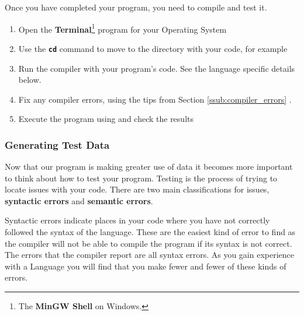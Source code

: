 Once you have completed your program, you need to compile and test it. 

\begin{enumerate}
  \item Open the \textbf{Terminal}\footnote{The \textbf{MinGW Shell} on Windows.} program for your Operating System
  \item Use the \texttt{\textbf{cd}} command to move to the directory with your code, for example \newline {}
  \item Run the compiler with your program's code. See the language specific details below.
  \item Fix any compiler errors, using the tips from Section \ref{ssub:compiler_errors} .
  \item Execute the program using  and check the results
\end{enumerate}



\subsubsection{Generating Test Data} %
\label{ssub:generating_test_data}

Now that our program is making greater use of data it becomes more important to think about how to test your program. Testing is the process of trying to locate issues with your code. There are two main classifications for issues, \textbf{syntactic errors} and \textbf{semantic errors}.

Syntactic errors indicate places in your code where you have not correctly followed the syntax of the language. These are the easiest kind of error to find as the compiler will not be able to compile the program if its syntax is not correct. The errors that the compiler report are all syntax errors. As you gain experience with a Language you will find that you make fewer and fewer of these kinds of errors. 

